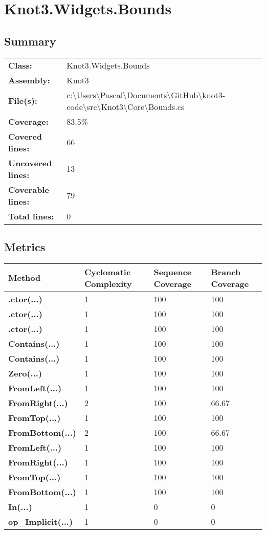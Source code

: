 \documentclass[a4paper,10pt]{article}
\begin{document}
\section{Knot3.Widgets.Bounds}
\subsection{Summary}
\begin{longtable}[l]{ll}
\textbf{Class:} & Knot3.Widgets.Bounds\\
\textbf{Assembly:} & Knot3\\
\textbf{File(s):} & \begin{minipage}[t]{12cm}{c:\textbackslash Users\textbackslash Pascal\textbackslash Documents\textbackslash GitHub\textbackslash knot3-code\textbackslash src\textbackslash Knot3\textbackslash Core\textbackslash Bounds.cs}\end{minipage} \\
\textbf{Coverage:} & 83.5\%\\
\textbf{Covered lines:} & 66\\
\textbf{Uncovered lines:} & 13\\
\textbf{Coverable lines:} & 79\\
\textbf{Total lines:} & 0\\
\end{longtable}
\subsection{Metrics}
\begin{longtable}[l]{|l|l|l|l|}
\hline
\textbf{Method} & \textbf{Cyclomatic Complexity} & \textbf{Sequence Coverage} & \textbf{Branch Coverage}\\
\hline
\textbf{.ctor(...)} & 1 & 100 & 100\\
\hline
\textbf{.ctor(...)} & 1 & 100 & 100\\
\hline
\textbf{.ctor(...)} & 1 & 100 & 100\\
\hline
\textbf{Contains(...)} & 1 & 100 & 100\\
\hline
\textbf{Contains(...)} & 1 & 100 & 100\\
\hline
\textbf{Zero(...)} & 1 & 100 & 100\\
\hline
\textbf{FromLeft(...)} & 1 & 100 & 100\\
\hline
\textbf{FromRight(...)} & 2 & 100 & 66.67\\
\hline
\textbf{FromTop(...)} & 1 & 100 & 100\\
\hline
\textbf{FromBottom(...)} & 2 & 100 & 66.67\\
\hline
\textbf{FromLeft(...)} & 1 & 100 & 100\\
\hline
\textbf{FromRight(...)} & 1 & 100 & 100\\
\hline
\textbf{FromTop(...)} & 1 & 100 & 100\\
\hline
\textbf{FromBottom(...)} & 1 & 100 & 100\\
\hline
\textbf{In(...)} & 1 & 0 & 0\\
\hline
\textbf{op\_Implicit(...)} & 1 & 0 & 0\\
\hline
\end{longtable}
\end{document}
